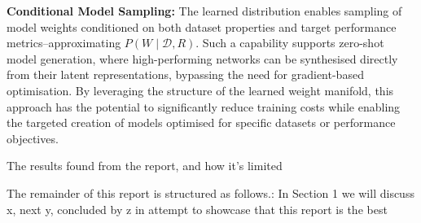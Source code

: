 \textbf{Conditional Model Sampling:} The learned distribution enables sampling of model weights conditioned on both dataset properties and target performance metrics--approximating \( P(W \mid \mathcal{D}, R) \). Such a capability supports zero-shot model generation, where high-performing networks can be synthesised directly from their latent representations, bypassing the need for gradient-based optimisation. By leveraging the structure of the learned weight manifold, this approach has the potential to significantly reduce training costs while enabling the targeted creation of models optimised for specific datasets or performance objectives.


The results found from the report, and how it's limited 

The remainder of this report is structured as follows.:
    In Section 1 we will discuss x, next y, concluded by z in attempt to showcase that this report is the best






